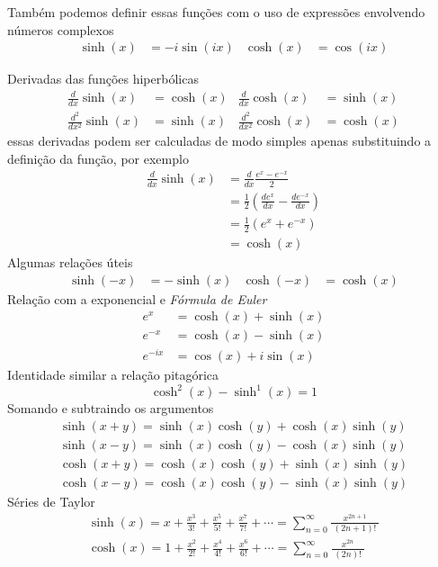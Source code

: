 Também podemos definir essas funções com o uso de expressões envolvendo números complexos
\begin{align*}
\sinh(x) & = -i \sin(ix) &
\cosh(x) & =    \cos(ix)
\end{align*}

Derivadas das funções hiperbólicas
\begin{align*}
\frac{d  }{dx  } \sinh(x) & = \cosh(x) & \frac{d  }{dx  } \cosh(x) & = \sinh(x) \\[3mm]
\frac{d^2}{dx^2} \sinh(x) & = \sinh(x) & \frac{d^2}{dx^2} \cosh(x) & = \cosh(x)
\end{align*}
essas derivadas podem ser calculadas de modo simples apenas substituindo a
definição da função, por exemplo
\begin{align*}
	\frac{d}{dx} \sinh(x) & = \frac{d}{dx} \frac{e^x - e^{-x}}{2}                             \\[3mm]
	                      & = \frac{1}{2} \left( \frac{de^x}{dx} - \frac{de^{-x}}{dx} \right) \\[3mm]
	                      & = \frac{1}{2} \left( e^x + e^{-x} \right)                         \\[3mm]
	                      & = \cosh(x)
\end{align*}
Algumas relações úteis
\begin{align*}
\sinh(-x) & = -\sinh(x) &
\cosh(-x) & =  \cosh(x)
\end{align*}
Relação com a exponencial e \emph{Fórmula de Euler}
\begin{align*}
	e^x     & = \cosh(x) + \sinh(x) \\
	e^{-x}  & = \cosh(x) - \sinh(x) \\
	e^{-ix} & = \cos(x) + i\sin(x)
\end{align*}
Identidade similar a relação pitagórica
\[ \cosh^2(x) - \sinh^1(x) = 1 \]
Somando e subtraindo os argumentos
\begin{gather*}
\sinh(x+y) = \sinh(x)\cosh(y) + \cosh(x)\sinh(y) \\
\sinh(x-y) = \sinh(x)\cosh(y) - \cosh(x)\sinh(y) \\
\cosh(x+y) = \cosh(x)\cosh(y) + \sinh(x)\sinh(y) \\
\cosh(x-y) = \cosh(x)\cosh(y) - \sinh(x)\sinh(y)
\end{gather*}
Séries de Taylor
\begin{gather*}
\sinh(x) = x + \frac{x^3}{3!} + \frac{x^5}{5!} + \frac{x^7}{7!} + \cdots
         = \sum_{n=0}^{\infty} \frac{x^{2n+1}}{\;(2n+1)!\;} \\
\cosh(x) = 1 + \frac{x^2}{2!} + \frac{x^4}{4!} + \frac{x^6}{6!} + \cdots
         = \sum_{n=0}^{\infty} \frac{x^{2n}}{\;(2n)!\;}
\end{gather*}
